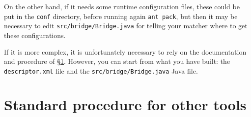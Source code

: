 \documentclass{article}
\def\file#1{\textcolor{grayy}{\texttt{#1}}}
\newcommand\smtt[1]{\texttt{\small #1}}
\begin{document}
On the other hand, if it needs some runtime configuration files, these could be put in the \file{conf} directory, before running again \smtt{ant pack}, but then it may be necessary to edit \file{src/bridge/Bridge.java} for telling your matcher where to get these configurations.

If it is more complex, it is unfortunately necessary to rely on the documentation and procedure of \S\ref{sec:wrap}.
However, you can start from what you have built: the \file{descriptor.xml} file and the \file{src/bridge/Bridge.java} Java file.


\section{Standard procedure for other tools}
\label{sec:wrap}
\end{document}
